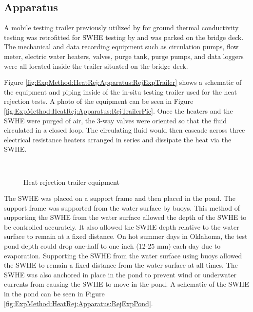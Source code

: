 	\subsection{Apparatus}
	\label{subsec:ExpMethod:HeatRej:Apparatus}

A mobile testing trailer previously utilized by \cite{Austin1998} for ground thermal conductivity testing was retrofitted for SWHE testing by \cite{Hansen2011} and was parked on the bridge deck. The mechanical and data recording equipment such as circulation pumps, flow meter, electric water heaters, valves, purge tank, purge pumps, and data loggers were all located inside the trailer situated on the bridge deck.

Figure \ref{fig:ExpMethod:HeatRej:Apparatus:RejExpTrailer} shows a schematic of the equipment and piping inside of the in-situ testing trailer used for the heat rejection tests. A photo of the equipment can be seen in Figure \ref{fig:ExpMethod:HeatRej:Apparatus:RejTrailerPic}. Once the heaters and the SWHE were purged of air, the 3-way valves were oriented so that the fluid circulated in a closed loop. The circulating fluid would then cascade across three electrical resistance heaters arranged in series and dissipate the heat via the SWHE.

	\begin{figure}
		\centering
		\,
		\caption[Heat rejection trailer equipment]{Heat rejection trailer equipment}
		\label{fig:ExpMethod:HeatRej:Apparatus:RejTrailer}
	\end{figure}

The SWHE was placed on a support frame and then placed in the pond. The support frame was supported from the water surface by buoys. This method of supporting the SWHE from the water surface allowed the depth of the SWHE to be controlled accurately. It also allowed the SWHE depth relative to the water surface to remain at a fixed distance. On hot summer days in Oklahoma, the test pond depth could drop one-half to one inch (12-25 mm) each day due to evaporation. Supporting the SWHE from the water surface using buoys allowed the SWHE to remain a fixed distance from the water surface at all times. The SWHE was also anchored in place in the pond to prevent wind or underwater currents from causing the SWHE to move in the pond. A schematic of the SWHE in the pond can be seen in Figure \ref{fig:ExpMethod:HeatRej:Apparatus:RejExpPond}.

